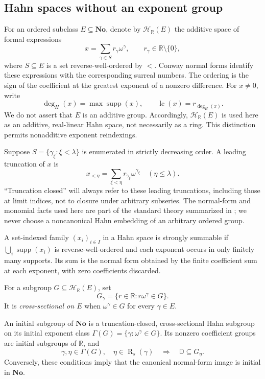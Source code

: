 \documentclass[11pt]{article}
\theoremstyle{definition}
\theoremstyle{remark}
\newcommand{\No}{\ensuremath{\mathbf{No}}}
\newcommand{\R}{\mathbb{R}}
\newcommand{\D}{\mathbb{D}}
\newcommand{\supp}{\operatorname{supp}}
\newcommand{\Rs}{\operatorname{R}_{s}}
\newcommand{\Hahn}[2]{\mathcal{H}_{#1}(#2)}
\newcommand{\lc}{\operatorname{lc}}
\newcommand{\hdeg}{\operatorname{deg}_{H}}
\begin{document}
\subsection{Hahn spaces without an exponent group}
For an ordered subclass $E\subseteq\No$, denote by $\Hahn{\R}{E}$
the additive space of formal expressions
\begin{equation}\label{isg:eq:nf}
 x=\sum_{\gamma\in S} r_\gamma\omega^\gamma,
 \qquad r_\gamma\in\R\setminus\{0\},
\end{equation}
where $S\subseteq E$ is a set reverse-well-ordered by $<$.
Conway normal forms identify these expressions with the corresponding
surreal numbers. The ordering is the sign of the coefficient at the
greatest exponent of a nonzero difference. For $x\ne0$, write
\[
 \hdeg(x)=\max\supp(x),\qquad
 \lc(x)=r_{\hdeg(x)}.
\]
We do not assert that $E$ is an additive group. Accordingly,
$\Hahn{\R}{E}$ is used here as an additive, real-linear Hahn space, not
necessarily as a ring. This distinction permits nonadditive exponent
reindexings.

Suppose $S=\{\gamma_\xi:\xi<\lambda\}$ is enumerated in strictly
decreasing order. A leading truncation of $x$ is
\[
 x_{<\eta}=\sum_{\xi<\eta}r_{\gamma_\xi}\omega^{\gamma_\xi}
 \quad(\eta\le\lambda).
\]
``Truncation closed'' will always refer to these leading truncations,
including those at limit indices, not to closure under arbitrary
subseries. The normal-form and monomial facts used here are part of the
standard theory summarized in \cite{EK}; we never choose a noncanonical
Hahn embedding of an arbitrary ordered group.

\begin{definition}\label{isg:def:strong}
A set-indexed family $(x_i)_{i\in I}$ in a Hahn space is strongly
summable if $\bigcup_i\supp(x_i)$ is reverse-well-ordered and each
exponent occurs in only finitely many supports. Its sum is the normal
form obtained by the finite coefficient sum at each exponent, with zero
coefficients discarded.
\end{definition}

For a subgroup $G\subseteq\Hahn{\R}{E}$, set
\[
 G_\gamma=\{r\in\R:r\omega^\gamma\in G\}.
\]
It is \emph{cross-sectional on $E$} when $\omega^\gamma\in G$ for
every $\gamma\in E$.

\begin{fact}\label{isg:fact:EK}
An initial subgroup of $\No$ is a truncation-closed, cross-sectional
Hahn subgroup on its initial exponent class
$\Gamma(G)=\{\gamma:\omega^\gamma\in G\}$. Its nonzero coefficient
groups are initial subgroups of $\R$, and
\begin{equation}\label{isg:eq:dyadic}
 \gamma,\eta\in\Gamma(G),\quad \eta\in\Rs(\gamma)
 \quad\Longrightarrow\quad \D\subseteq G_\eta.
\end{equation}
Conversely, these conditions imply that the canonical normal-form image
is initial in $\No$.
\end{fact}
\end{document}
